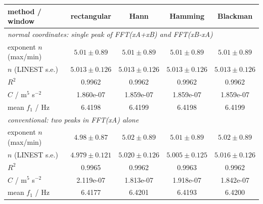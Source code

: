 \begin{tabular}{@{}lcccc@{}}
\toprule
method / window & rectangular & Hann & Hamming & Blackman \\
\midrule
\multicolumn{5}{l}{\emph{normal coordinates: single peak of FFT(xA+xB) and FFT(xB-xA)}} \\
exponent $n$ (max/min) & $5.01\pm0.89$ & $5.01\pm0.89$ & $5.01\pm0.89$ & $5.01\pm0.89$ \\
$n$ (LINEST s.e.) & $5.013\pm0.126$ & $5.013\pm0.126$ & $5.013\pm0.126$ & $5.013\pm0.126$ \\
$R^2$ & 0.9962 & 0.9962 & 0.9962 & 0.9962 \\
$C$ / m$^5$ s$^{-2}$ & 1.860e-07 & 1.859e-07 & 1.859e-07 & 1.859e-07 \\
mean $f_1$ / Hz & 6.4198 & 6.4199 & 6.4198 & 6.4199 \\
\midrule
\multicolumn{5}{l}{\emph{conventional: two peaks in FFT(xA) alone}} \\
exponent $n$ (max/min) & $4.98\pm0.87$ & $5.02\pm0.89$ & $5.01\pm0.89$ & $5.02\pm0.89$ \\
$n$ (LINEST s.e.) & $4.979\pm0.121$ & $5.020\pm0.126$ & $5.005\pm0.125$ & $5.016\pm0.126$ \\
$R^2$ & 0.9965 & 0.9962 & 0.9963 & 0.9962 \\
$C$ / m$^5$ s$^{-2}$ & 2.119e-07 & 1.813e-07 & 1.918e-07 & 1.842e-07 \\
mean $f_1$ / Hz & 6.4177 & 6.4201 & 6.4193 & 6.4200 \\
\bottomrule
\end{tabular}